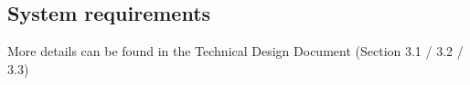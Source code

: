 \subsection{System requirements}
More details can be found in the Technical Design Document (Section 3.1 / 3.2 / 3.3)
